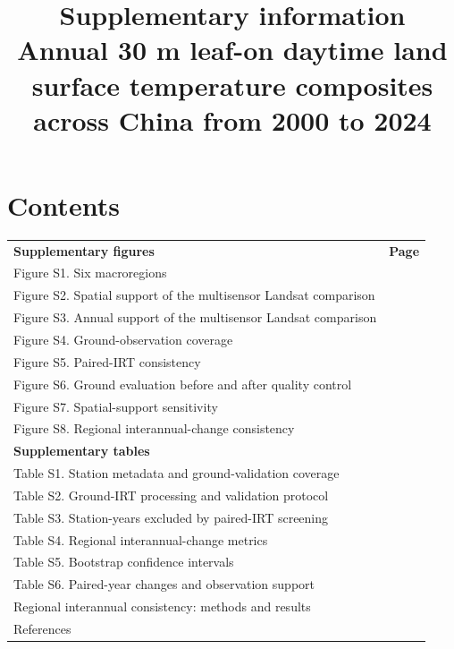 \documentclass[11pt,a4paper]{article}
\title{Supplementary information\\[0.5em]\large Annual 30 m leaf-on daytime land surface temperature composites across China from 2000 to 2024}
\author{}
\date{}
\begin{document}
\ifdefined\LineNumberedReview
  \modulolinenumbers[1]
  \linenumbers
\fi
\maketitle

\section*{Contents}
\noindent\begin{tabular}{@{}p{14.7cm}r@{}}
\textbf{Supplementary figures} & \textbf{Page}\\
Figure S1. Six macroregions & \pageref*{fig:s1-macroregions}\\
Figure S2. Spatial support of the multisensor Landsat comparison & \pageref*{fig:s2-landsat-density}\\
Figure S3. Annual support of the multisensor Landsat comparison & \pageref*{fig:s3-landsat-annual}\\
Figure S4. Ground-observation coverage & \pageref*{fig:s4-ground-coverage}\\
Figure S5. Paired-IRT consistency & \pageref*{fig:s5-ground-qc}\\
Figure S6. Ground evaluation before and after quality control & \pageref*{fig:s6-ground-set-comparison}\\
Figure S7. Spatial-support sensitivity & \pageref*{fig:s7-ground-support}\\
Figure S8. Regional interannual-change consistency & \pageref*{fig:s8-interannual}\\[0.7em]
\textbf{Supplementary tables} & \\
Table S1. Station metadata and ground-validation coverage & \pageref*{tab:s1-stations}\\
Table S2. Ground-IRT processing and validation protocol & \pageref*{tab:s2-protocol}\\
Table S3. Station-years excluded by paired-IRT screening & \pageref*{tab:s3-ground-qc}\\
Table S4. Regional interannual-change metrics & \pageref*{tab:s4-interannual-metrics}\\
Table S5. Bootstrap confidence intervals & \pageref*{tab:s5-interannual-ci}\\
Table S6. Paired-year changes and observation support & \pageref*{tab:s6-interannual-pairs}\\[0.7em]
Regional interannual consistency: methods and results & \pageref*{sec:si-interannual}\\
References & \pageref*{sec:si-references}\\
\end{tabular}
\clearpage
\end{document}
